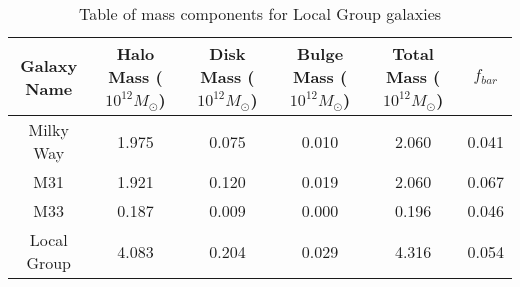 \documentclass[12pt]{article}
\begin{document}
\begin{table}[h]
    \centering
    \caption{Table of mass components for Local Group galaxies}
    \begin{adjustbox}{width=\textwidth}
        \begin{tabular}{|c|c|c|c|c|c|}
        \hline
        Galaxy Name & Halo Mass ($10^{12} M_{\odot}$) & Disk Mass ($10^{12} M_{\odot}$) & Bulge Mass ($10^{12} M_{\odot}$) & Total Mass ($10^{12} M_{\odot}$) & $f_{bar}$\\ \hline
        Milky Way & 1.975 & 0.075 & 0.010 & 2.060 & 0.041\\
        M31 & 1.921 & 0.120 & 0.019 & 2.060 & 0.067\\
        M33 & 0.187 & 0.009 & 0.000 & 0.196 & 0.046\\
        Local Group & 4.083 & 0.204 & 0.029 & 4.316 & 0.054\\ \hline
        \end{tabular}
    \end{adjustbox}
\end{table}
\end{document}
